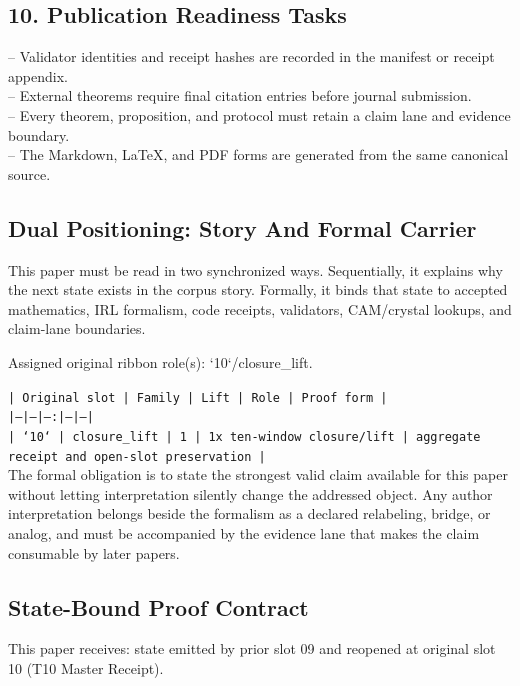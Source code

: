 \documentclass[11pt]{article}
\begin{document}
\subsection*{10. Publication Readiness Tasks}

\noindent{}-- Validator identities and receipt hashes are recorded in the manifest or receipt appendix.\\
\noindent{}-- External theorems require final citation entries before journal submission.\\
\noindent{}-- Every theorem, proposition, and protocol must retain a claim lane and evidence boundary.\\
\noindent{}-- The Markdown, LaTeX, and PDF forms are generated from the same canonical source.\\

\subsection*{Dual Positioning: Story And Formal Carrier}

This paper must be read in two synchronized ways. Sequentially, it explains why
the next state exists in the corpus story. Formally, it binds that state to
accepted mathematics, IRL formalism, code receipts, validators, CAM/crystal
lookups, and claim-lane boundaries.

Assigned original ribbon role(s): `10`/closure\_lift.

\noindent\texttt{| Original slot | Family | Lift | Role | Proof form |}\\
\noindent\texttt{|---|---|---:|---|---|}\\
\noindent\texttt{| `10` | closure\_lift | 1 | 1x ten-window closure/lift | aggregate receipt and open-slot preservation |}\\

The formal obligation is to state the strongest valid claim available for this
paper without letting interpretation silently change the addressed object. Any
author interpretation belongs beside the formalism as a declared relabeling,
bridge, or analog, and must be accompanied by the evidence lane that makes the
claim consumable by later papers.

\subsection*{State-Bound Proof Contract}

This paper receives: state emitted by prior slot 09 and reopened at original slot 10 (T10 Master Receipt).
\end{document}
